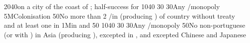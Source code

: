 %
 
%
%
{20}{40}{\COL on a city of the coast of \continentIndia; half-success for
  \granderegionCeylan}%
%
%
{10}{40}{}%
%
%
{}{30}{}%
%
%
{}{30}{Any \CTZ/\STZ monopoly}%
%
\EUobjective5M{Colonisation}{}%
{}{50}{No more than 2 \COL/\TP in \continentAsia (producing \POSPICE) of
  country without treaty and at least one \COL in \continentBrazil}%
%
%
%
\EUobjective1M{\TP in \payschine and \paysjapon}{}%
{}{50}{}%
%
%
{10}{40}{}%
%
%
{}{30}{}%
%
%
{}{30}{Any \CTZ/\STZ monopoly}%
%
%
{}{50}{No non-portuguese \TP (or with \dipAT) in Asia (producing \POSPICE),
  excepted in , and excepted Chinese and Japanese
  \TP}%

